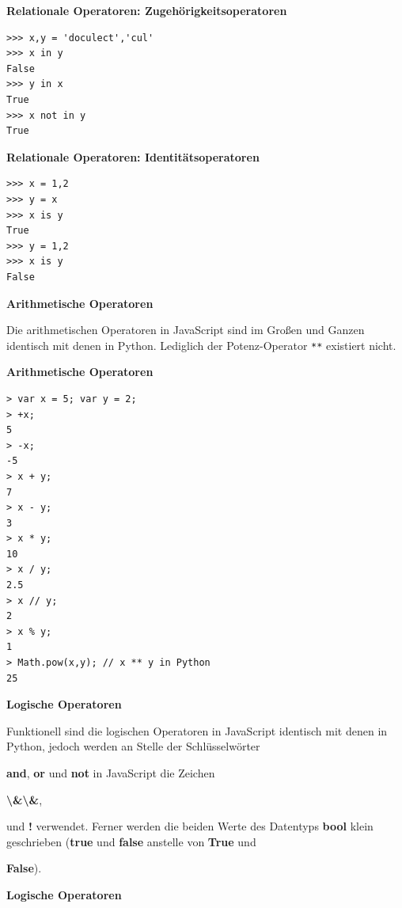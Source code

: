 \par\noindent\textbf{Relationale Operatoren: Zugehörigkeitsoperatoren}

\begin{verbatim}
>>> x,y = 'doculect','cul'
>>> x in y
False
>>> y in x
True
>>> x not in y
True
\end{verbatim}




\par\noindent\textbf{Relationale Operatoren: Identitätsoperatoren}

\begin{verbatim}
>>> x = 1,2
>>> y = x
>>> x is y
True
>>> y = 1,2
>>> x is y
False
\end{verbatim}




\par\noindent\textbf{Arithmetische Operatoren}

Die arithmetischen Operatoren in JavaScript sind im Großen und Ganzen
identisch mit denen in Python. Lediglich der Potenz-Operator \texttt{**}
existiert nicht.




\par\noindent\textbf{Arithmetische Operatoren}

\begin{verbatim}
> var x = 5; var y = 2;
> +x;
5
> -x;
-5
> x + y;
7
> x - y;
3
> x * y;
10
> x / y;
2.5
> x // y;
2
> x % y;
1
> Math.pow(x,y); // x ** y in Python
25
\end{verbatim}




\par\noindent\textbf{Logische Operatoren}

Funktionell sind die logischen Operatoren in JavaScript identisch mit
denen in Python, jedoch werden an Stelle der Schlüsselwörter
\par\noindent\textbf{and}, \textbf{or} und \textbf{not} in JavaScript die Zeichen
\par\noindent\textbf{\textbackslash{}\&\textbackslash{}\&},
\par\noindent\textbf{\textbar{}\textbar{}} und \textbf{!} verwendet. Ferner werden
die beiden Werte des Datentyps \textbf{bool} klein geschrieben
(\textbf{true} und \textbf{false} anstelle von \textbf{True} und
\par\noindent\textbf{False}).




\par\noindent\textbf{Logische Operatoren}

